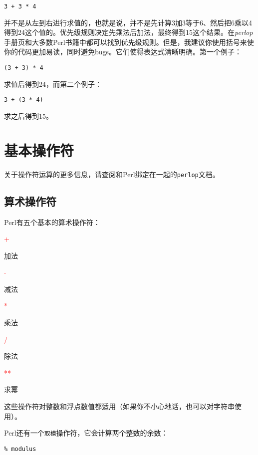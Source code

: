 \begin{lstlisting}
3 + 3 * 4
\end{lstlisting}

并不是从左到右进行求值的，也就是说，并不是先计算3加3等于6、然后把6乘以4得到24这个值的。优先级规则决定先乘法后加法，最终得到15这个结果。在\textit{perlop}手册页和大多数Perl书籍中都可以找到优先级规则。但是，我建议你使用括号来使你的代码更加易读，同时避免bugs。它们使得表达式清晰明确。第一个例子：

\begin{lstlisting}
(3 + 3) * 4
\end{lstlisting}

求值后得到24，而第二个例子：

\begin{lstlisting}
3 + (3 * 4)
\end{lstlisting}

求之后得到15。

\section{基本操作符}
关于操作符运算的更多信息，请查阅和Perl绑定在一起的\verb|perlop|文档。

\subsection{算术操作符}
Perl有五个基本的算术操作符：

\noindent
\textcolor{red}{+}
\begin{adjustwidth}{1cm}{}
加法
\end{adjustwidth}
\textcolor{red}{-}
\begin{adjustwidth}{1cm}{}
减法
\end{adjustwidth}
\textcolor{red}{*}
\begin{adjustwidth}{1cm}{}
乘法
\end{adjustwidth}
\textcolor{red}{/}
\begin{adjustwidth}{1cm}{}
除法
\end{adjustwidth}
\textcolor{red}{**}
\begin{adjustwidth}{1cm}{}
求幂
\end{adjustwidth}

这些操作符对整数和浮点数值都适用（如果你不小心地话，也可以对字符串使用）。

Perl还有一个\verb|取模|操作符，它会计算两个整数的余数：

\begin{lstlisting}
% modulus
\end{lstlisting}

